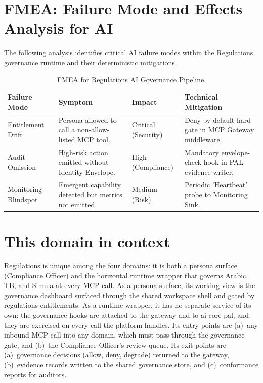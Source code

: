 \documentclass[11pt,a4paper,twoside]{report}
\begin{document}
\section{FMEA: Failure Mode and Effects Analysis for AI}
\label{sec:fmea-ai}

The following analysis identifies critical AI failure modes within the Regulations governance runtime and their deterministic mitigations.

\begin{table}[htbp]
\centering
\footnotesize
\caption{FMEA for Regulations AI Governance Pipeline.}
\label{tab:reg-fmea}
\begin{tabularx}{\textwidth}{@{}l X X X@{}}
\toprule
\textbf{Failure Mode} & \textbf{Symptom} & \textbf{Impact} & \textbf{Technical Mitigation} \\
\midrule
Entitlement Drift & Persona allowed to call a non-allow-listed MCP tool. & Critical (Security) & Deny-by-default hard gate in MCP Gateway middleware. \\
Audit Omission & High-risk action emitted without Identity Envelope. & High (Compliance) & Mandatory envelope-check hook in PAL evidence-writer. \\
Monitoring Blindspot & Emergent capability detected but metrics not emitted. & Medium (Risk) & Periodic 'Heartbeat' probe to Monitoring Sink. \\
\bottomrule
\end{tabularx}
\end{table}

\section{This domain in context}
\label{sec:agent-domain-context}
Regulations is unique among the four domains: it is both a persona
surface (Compliance Officer) and the horizontal runtime wrapper that
governs Arabic, TB, and Simula at every MCP call. As a persona
surface, its working view is the governance dashboard surfaced
through the shared workspace shell and gated by regulations
entitlements. As a runtime wrapper, it has no separate service of
its own: the governance hooks are attached to the gateway and to
ai-core-pal, and they are exercised on every call the platform
handles. Its entry points are (a)~any inbound MCP call into any
domain, which must pass through the governance gate, and (b)~the
Compliance Officer's review queue. Its exit points are
(a)~governance decisions (allow, deny, degrade) returned to the
gateway, (b)~evidence records written to the shared governance
store, and (c)~conformance reports for auditors.
\end{document}
